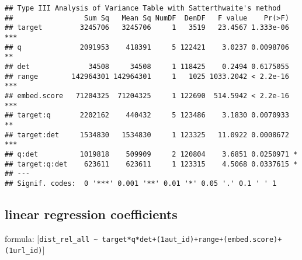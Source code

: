 \documentclass[
  12pt,
  oneside]{book}
\begin{document}
\begin{verbatim}
## Type III Analysis of Variance Table with Satterthwaite's method
##                 Sum Sq   Mean Sq NumDF  DenDF   F value    Pr(>F)    
## target         3245706   3245706     1   3519   23.4567 1.333e-06 ***
## q              2091953    418391     5 122421    3.0237 0.0098706 ** 
## det              34508     34508     1 118425    0.2494 0.6175055    
## range        142964301 142964301     1   1025 1033.2042 < 2.2e-16 ***
## embed.score   71204325  71204325     1 122690  514.5942 < 2.2e-16 ***
## target:q       2202162    440432     5 123486    3.1830 0.0070933 ** 
## target:det     1534830   1534830     1 123325   11.0922 0.0008672 ***
## q:det          1019818    509909     2 120804    3.6851 0.0250971 *  
## target:q:det    623611    623611     1 123315    4.5068 0.0337615 *  
## ---
## Signif. codes:  0 '***' 0.001 '**' 0.01 '*' 0.05 '.' 0.1 ' ' 1
\end{verbatim}

\subsection{linear regression coefficients}\label{linear-regression-coefficients}

formula: {[}\texttt{dist\_rel\_all\ \textasciitilde{}\ target*q*det+(1\textbar{}aut\_id)+range+(embed.score)+(1\textbar{}url\_id)}{]}
\end{document}
